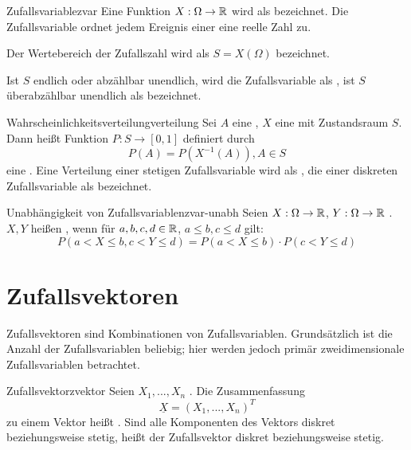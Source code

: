 \begin{definition}{Zufallsvariable}{zvar}
Eine Funktion $X: \Omega \to \mathbb{R}$ wird als 
bezeichnet. Die Zufallsvariable ordnet jedem Ereignis einer
 eine reelle Zahl zu.

Der Wertebereich der Zufallszahl wird als  $S = X(\Omega)$
bezeichnet.

Ist $S$ endlich oder abzählbar unendlich, wird die Zufallsvariable als
, ist $S$ überabzählbar unendlich als  bezeichnet.
\end{definition}

\begin{definition}{Wahrscheinlichkeitsverteilung}{verteilung}
Sei $A$ eine , $X$ eine 
mit Zustandsraum $S$. Dann heißt Funktion $P: S \rightarrow [0,1]$ definiert
durch
\[
P(A) = P(X^{-1}(A)), A \in S
\]
eine . Eine Verteilung einer stetigen
Zufallsvariable wird als , die einer diskreten
Zufallsvariable als  bezeichnet.
\end{definition}

\begin{definition}{Unabhängigkeit von Zufallsvariablen}{zvar-unabh}
Seien $X: \Omega \to \mathbb{R}$, $Y: \Omega \to \mathbb{R}$ . $X,
Y$ heißen , wenn für $a,b,c,d \in \mathbb{R}$, $a\le b, c\le d$ gilt:
\[
P(a < X\le b,c<Y\le d) = P(a<X\le b)\cdot P(c<Y\le d)
\]
\end{definition}

\section{Zufallsvektoren}

Zufallsvektoren sind Kombinationen von Zufallsvariablen. Grundsätzlich ist die
Anzahl der Zufallsvariablen beliebig; hier werden jedoch primär zweidimensionale
Zufallsvariablen betrachtet.

\begin{definition}{Zufallsvektor}{zvektor}
Seien $X_1, ..., X_n$ . Die Zusammenfassung
\[
\underline{X} = (X_1, ..., X_n)^T
\]
zu einem Vektor heißt . Sind alle Komponenten des Vektors
diskret beziehungsweise stetig, heißt der Zufallsvektor diskret beziehungsweise
stetig.
\end{definition}

